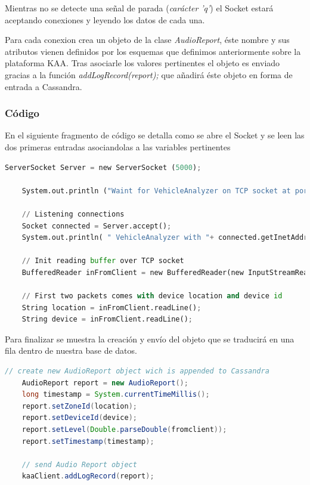 Mientras no se detecte una señal de parada (\textit{carácter 'q'}) el Socket estará aceptando conexiones y leyendo los datos de cada una.

Para cada conexion crea un objeto de la clase \textit{AudioReport}, éste nombre y sus atributos vienen definidos por los esquemas que definimos anteriormente sobre la plataforma KAA. Tras asociarle los valores pertinentes el objeto es enviado gracias a la función \textit{addLogRecord(report);} que añadirá éste objeto en forma de entrada a Cassandra.

\newpage

\subsubsection{Código}

En el siguiente fragmento de código se detalla como se abre el Socket y se leen las dos primeras entradas asociandolas a las variables pertinentes

\begin{lstlisting}[language=python,caption={Inicialización del Socket},label={lst:pi1}]
	ServerSocket Server = new ServerSocket (5000);

	System.out.println ("Waint for VehicleAnalyzer on TCP socket at port 5000");

	// Listening connections
	Socket connected = Server.accept();
	System.out.println( " VehicleAnalyzer with "+ connected.getInetAddress() +":"+connected.getPort()+" is connected! ");

	// Init reading buffer over TCP socket
	BufferedReader inFromClient = new BufferedReader(new InputStreamReader (connected.getInputStream()));

	// First two packets comes with device location and device id
	String location = inFromClient.readLine();
	String device = inFromClient.readLine();
\end{lstlisting}

Para finalizar se muestra la creación y envío del objeto que se traducirá en una fila dentro de nuestra base de datos.

\begin{lstlisting}[language=java,caption={Creación y envío de datos a Cassandra},label={lst:pi1}]
	// create new AudioReport object wich is appended to Cassandra
	AudioReport report = new AudioReport();
	long timestamp = System.currentTimeMillis();
	report.setZoneId(location);
	report.setDeviceId(device);
	report.setLevel(Double.parseDouble(fromclient));
	report.setTimestamp(timestamp);

	// send Audio Report object
	kaaClient.addLogRecord(report);
\end{lstlisting}

